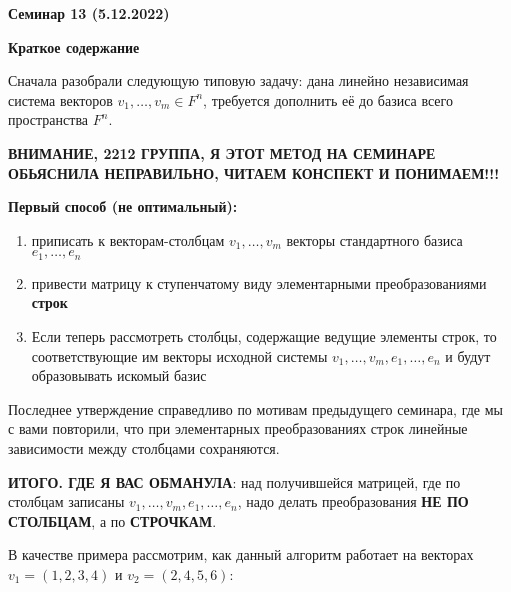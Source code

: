 \documentclass[10pt, a4paper]{extarticle}
\theoremstyle{definition}
\begin{document}
\begin{center}
\small
\noindent{}
\end{center}

\large

\begin{center}
\textbf{Семинар 13 (5.12.2022)}
\end{center}

\textbf{Краткое содержание}

Сначала разобрали следующую типовую задачу: дана линейно независимая система векторов $v_1,\dots, v_m \in F^n$, требуется дополнить её 
до базиса всего пространства $F^n$.

\textbf{ВНИМАНИЕ, 2212 ГРУППА, Я ЭТОТ МЕТОД НА СЕМИНАРЕ ОБЬЯСНИЛА НЕПРАВИЛЬНО, ЧИТАЕМ КОНСПЕКТ И ПОНИМАЕМ!!!}

\textbf{Первый способ (не оптимальный):} 
\begin{enumerate}
    \item приписать к векторам-столбцам $v_1, \dots, v_m$ векторы стандартного базиса $e_1, \dots, e_n$
    \item привести матрицу к ступенчатому виду элементарными преобразованиями \textbf{строк}
    \item Если теперь рассмотреть столбцы, содержащие ведущие элементы строк, то соответствующие им векторы исходной системы 
    $v_1, \dots, v_m, e_1, \dots, e_n$ и будут образовывать искомый базис
\end{enumerate} 
Последнее утверждение справедливо по мотивам предыдущего семинара, где мы с вами повторили, что при элементарных преобразованиях
строк линейные зависимости между столбцами сохраняются.

\textbf{ИТОГО. ГДЕ Я ВАС ОБМАНУЛА}: над получившейся матрицей, где по столбцам записаны $v_1, \dots, v_m, e_1, \dots, e_n$,
надо делать преобразования \textbf{НЕ ПО СТОЛБЦАМ}, а по \textbf{СТРОЧКАМ}.

В качестве примера рассмотрим, как данный алгоритм работает на векторах $v_1 = (1,2,3,4)$ и $v_2 = (2,4,5,6)$:
\end{document}
